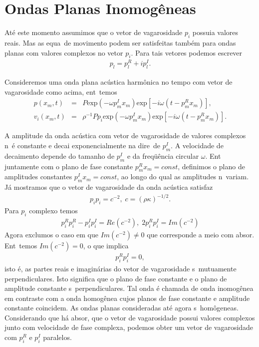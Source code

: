 
\section{Ondas Planas Inomog\^eneas}

At\'e este momento assumimos que o vetor de vagarosidade $p_{i}$ possuia
valores reais. Mas as equa\coes\ de movimento podem ser satisfeitas
tamb\'em para ondas planas com valores complexos no vetor $p_{i}$. Para
tais vetores podemos escrever
\begin{eqnarray}
p_{l} = p_{l}^{R}+ ip_{l}^{I}.
\end{eqnarray}

Consideremos uma onda plana ac\'ustica harm\^onica no tempo com vetor de
vagarosidade como acima, ent\ao\ temos
\begin{eqnarray}
p(x_{m},t) &=& P\mbox{exp}(-\omega p_{m}^{I}x_{m})\mbox{exp}[-i\omega (t-p_{m}^{R}x_{m})],\\
v_{i}(x_{m},t) &=& \rho^{-1}Pp_i\mbox{exp}(-\omega p_{m}^{I}x_m)\mbox{exp}[-i\omega (t-p_{m}^{R}x_{m})].
\end{eqnarray}

A amplitude da onda ac\'ustica com vetor de vagarosidade de valores
complexos n\ao\ \'e constante e decai exponencialmente na dire\cao\ de
$p_{m}^{I}$. A velocidade de decaimento depende do tamanho de
$p_{m}^{I}$ e da freq\"u\^encia circular $\omega$. Ent\ao\, juntamente com
o plano de fase constante $p_{m}^{R}x_m = const$, definimos o plano de
amplitudes constantes $p_{m}^{I}x_m = const$, ao longo do qual as
amplitudes n\ao\ variam. J\'a mostramos que o vetor de vagarosidade da
onda ac\'ustica satisfaz
\begin{eqnarray}
p_i p_i = c^{-2}, \; c=(\rho\kappa)^{-1/2}.
\end{eqnarray}
Para $p_i$ complexo temos
\begin{eqnarray}
p_i^R p_i^R - p_i^I p_i^I = Re(c^{-2}), \; 2p_i^R p_i^I = Im(c^{-2})
\end{eqnarray}
Agora exclu\ih mos o caso em que $Im(c^{-2}) \neq 0$ que corresponde a
meio com absor\cao. Ent\ao\ temos $Im(c^{-2}) = 0$, o que implica
\begin{eqnarray}
p_i^R p_i^I = 0,
\end{eqnarray}
isto \'e, as partes reais e imagin\'arias do vetor de vagarosidade s\ao\
mutuamente perpendiculares. Isto significa que o plano de fase constante
e o plano de amplitude constante s\ao\ perpendiculares. Tal onda \'e
chamada de onda inomog\^enea em contraste com a onda homog\^enea cujos
planos de fase constante e amplitude constante coincidem. As ondas
planas consideradas at\'e agora s\ao\ hom\^ogeneas. Considerando que h\'a
absor\cao, que o vetor de vagarosidade possui valores complexos junto
com velocidade de fase complexa, podemos obter um vetor de vagarosidade
com $p_i^R$ e $p_i^I$ paralelos.

